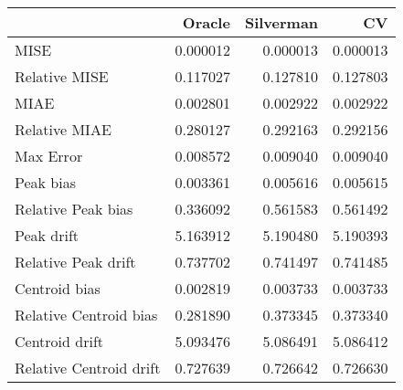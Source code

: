 \begin{tabular}{lrrr}
  \hline
 & Oracle & Silverman & CV \\ 
  \hline
MISE & 0.000012 & 0.000013 & 0.000013 \\ 
  Relative MISE & 0.117027 & 0.127810 & 0.127803 \\ 
  MIAE & 0.002801 & 0.002922 & 0.002922 \\ 
  Relative MIAE & 0.280127 & 0.292163 & 0.292156 \\ 
  Max Error & 0.008572 & 0.009040 & 0.009040 \\ 
  Peak bias & 0.003361 & 0.005616 & 0.005615 \\ 
  Relative Peak bias & 0.336092 & 0.561583 & 0.561492 \\ 
  Peak drift & 5.163912 & 5.190480 & 5.190393 \\ 
  Relative Peak drift & 0.737702 & 0.741497 & 0.741485 \\ 
  Centroid bias & 0.002819 & 0.003733 & 0.003733 \\ 
  Relative Centroid bias & 0.281890 & 0.373345 & 0.373340 \\ 
  Centroid drift & 5.093476 & 5.086491 & 5.086412 \\ 
  Relative Centroid drift & 0.727639 & 0.726642 & 0.726630 \\ 
   \hline
\end{tabular}
